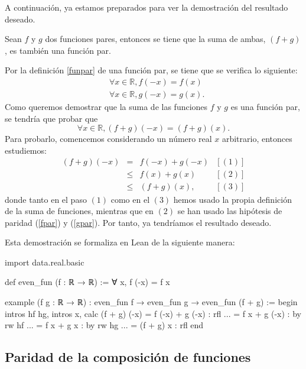 A continuación, ya estamos preparados para ver la demostración del
resultado deseado.

\begin{teorema}
  Sean \(f\) y \(g\) dos funciones pares, entonces
  se tiene que la suma de ambas, \((f+g)\), es también una función par.
\end{teorema}

\begin{demostracion}
  Por la definición \ref{funpar} de una función par, se tiene que se
  verifica lo siguiente:
  \begin{align}
    & ∀ x ∈ ℝ, f(-x)=f(x)  \label{fpar} \\
    & ∀ x ∈ ℝ, g(-x)=g(x). \label{gpar}
  \end{align}
  Como queremos demostrar que la suma de las funciones \(f\) y \(g\) es
  una función par, se tendría que probar que
  \begin{equation}
    ∀ x ∈ ℝ, (f+g)(-x) = (f+g)(x).
  \end{equation}
  Para probarlo, comencemos considerando un número real \(x\) arbitrario,
  entonces estudiemos:
  \[\begin{array}{llll}
      (f+g)(-x) &= &f(-x)+g(-x) & [(1)]\\
                &≤ &f(x)+g(x)   & [(2)] \\
                &≤ &(f+g)(x),   & [(3)]
    \end{array}\]
  donde tanto en el paso \((1)\) como en el \((3)\) hemos usado la
  propia definición de la suma de funciones, mientras que en \((2) \) se
  han usado las hipótesis de paridad (\ref{fpar}) y (\ref{gpar}). Por
  tanto, ya tendríamos el resultado deseado.
\end{demostracion}

Esta demostración se formaliza en Lean de la siguiente manera:
\begin{leancode}
import data.real.basic

def even_fun (f : ℝ → ℝ) := ∀ x, f (-x) = f x

example
  (f g : ℝ → ℝ)
  : even_fun f → even_fun g →  even_fun (f + g) :=
begin
  intros hf hg,
  intros x,
  calc (f + g) (-x)
      = f (-x) + g (-x) : rfl
  ... = f x + g (-x)    : by rw hf
  ... = f x + g x       : by rw hg
  ... = (f + g) x       : rfl
end
\end{leancode}


\subsection{Paridad de la composición de funciones}

